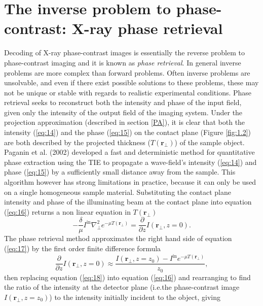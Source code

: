 \documentclass[10pt, a4paper, singlespacing]{report}
\begin{document}
\section{The inverse problem to phase-contrast: X-ray phase retrieval}\label{PR}
Decoding of X-ray phase-contrast images is essentially the reverse problem to phase-contrast imaging and it is known as \textit{phase retrieval}. 
In general inverse problems are more complex than forward problems. Often inverse problems are unsolvable, and even if there exist possible solutions to these problems, these may not be unique or stable with regards to realistic experimental conditions. 
Phase retrieval seeks to reconstruct both the intensity and phase of the input field, given only the intensity of the output field of the imaging system\cite{PagsTutes}\cite{Pags2002}. Under the projection approximation (described in section \ref{PA}), it is clear that both the intensity (\ref{eq:14}) and the phase (\ref{eq:15}) on the contact plane (Figure \ref{fig:1.2}) are both described by the projected thickness ($T(\mathbf{r}_{\perp})$) of the sample object. Paganin et al. (2002) developed a fast and deterministic method for quantitative phase extraction\cite{Pags2002} using the TIE to propagate a wave-field's intensity (\ref{eq:14}) and phase (\ref{eq:15}) by a sufficiently small distance away from the sample. This algorithm however has strong limitations in practice, because it can only be used on a single homogeneous sample material.
Substituting the contact plane intensity and phase of the illuminating beam at the contact plane into equation (\ref{eq:16}) returns a non linear equation in $T(\mathbf{r}_{\perp})$
\begin{equation}\label{eq:17}
- \frac{\delta}{\mu} I^{\mathrm{in}} \nabla^{2}_{\perp} e^{-\mu T(\mathbf{r}_{\perp})} = \frac{\partial}{\partial z}I(\mathbf{r}_{\perp}, z=0).
\end{equation}
The phase retrieval method\cite{Pags2002} approximates the right hand side of equation (\ref{eq:17}) by the first order finite difference formula
\begin{equation}\label{eq:18}
\frac{\partial}{\partial z}I(\mathbf{r}_{\perp}, z=0) \approx \frac{I(\mathbf{r}_{\perp}, z=z_0) - I^{\mathrm{in}} e^{-\mu T(\mathbf{r}_{\perp})}}{z_0},
\end{equation}
then replacing equation (\ref{eq:18}) into equation (\ref{eq:16}) and rearranging to find the ratio of the intensity at the detector plane (i.e.the phase-contrast image $I(\mathbf{r}_{\perp}, z = z_0)$) to the intensity initially incident to the object, giving
\end{document}

